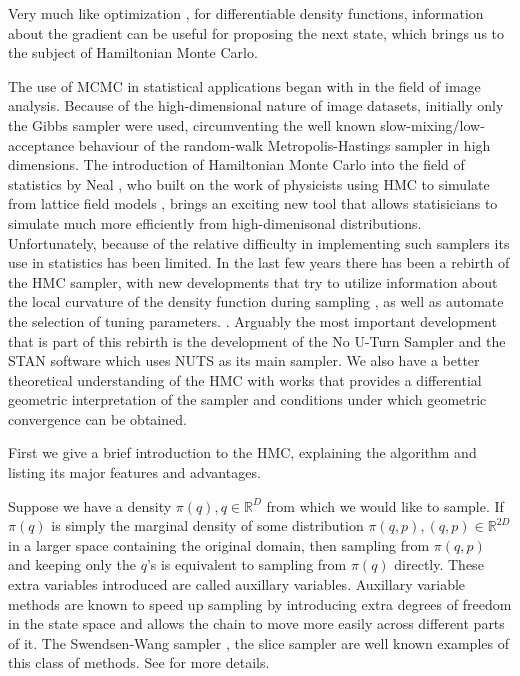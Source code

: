 \documentclass[]{report}
\begin{document}
Very much like optimization \cite{wright1999numerical}, for differentiable density
functions, information about the gradient can be useful for proposing the next
state, which brings us to the subject of Hamiltonian Monte Carlo.


The use of MCMC in statistical applications began with \cite{geman1984stochastic,besag1986statistical} in the field of image analysis. Because of the high-dimensional nature of image datasets, initially only the Gibbs sampler were used, circumventing the well known slow-mixing/low-acceptance behaviour of the random-walk Metropolis-Hastings sampler in high dimensions. The introduction of Hamiltonian Monte Carlo into the field of statistics by Neal \cite{neal2011mcmc,neal2012bayesian}, who built on the work of physicists using HMC to simulate from lattice field models \cite{duane1987hybrid}, brings an exciting new tool that allows statisicians to simulate much more efficiently from high-dimenisonal distributions. Unfortunately, because of the relative difficulty in implementing such samplers its use in statistics has been limited. In the last few years there has been a rebirth of the HMC sampler, with new developments that try to utilize information about the local curvature of the density function during  sampling \cite{girolami2011riemann,betancourt2013general}, as well as  automate the selection of tuning parameters.  \cite{hoffman2014no,betancourt2016identifying}. 
Arguably the most important development that is part of this rebirth is the development of the No U-Turn Sampler and the STAN software which uses NUTS as its main sampler. We also have a better theoretical understanding of the HMC with works \cite{betancourt2014geometric,livingstone2016geometric}
that provides a differential geometric interpretation of the sampler and conditions under which geometric convergence can be obtained.

First we give a brief introduction to the HMC, explaining the algorithm and listing its major features and advantages. 

Suppose we have a density $\pi(q),q \in \mathbb{R}^D$ from which we would like to
sample. If $\pi(q)$ is simply the marginal density of some distribution $\pi(q,p),
(q,p) \in \mathbb{R}^{2D}$ in a larger space containing the original domain, then sampling from $\pi(q,p)$ and keeping only the $q$'s is equivalent to sampling from $\pi(q)$ directly. These extra variables introduced are called auxillary variables. Auxillary variable methods are known to speed up sampling by introducing extra degrees of freedom in the state space and allows the chain to move more easily across different parts of it. The Swendsen-Wang sampler \cite{wang1990cluster}, the slice sampler\cite{wang1990cluster} are well known examples of this class of methods. See \cite{liang2011advanced,liu2008monte} for more details.
\end{document}
